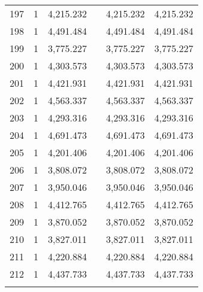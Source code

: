 \begin{table}[!htbp]
\begin{tabular}{@{\extracolsep{5pt}}lccccc}
197 & 1 & 4,215.232 &  & 4,215.232 & 4,215.232 \\ 
198 & 1 & 4,491.484 &  & 4,491.484 & 4,491.484 \\ 
199 & 1 & 3,775.227 &  & 3,775.227 & 3,775.227 \\ 
200 & 1 & 4,303.573 &  & 4,303.573 & 4,303.573 \\ 
201 & 1 & 4,421.931 &  & 4,421.931 & 4,421.931 \\ 
202 & 1 & 4,563.337 &  & 4,563.337 & 4,563.337 \\ 
203 & 1 & 4,293.316 &  & 4,293.316 & 4,293.316 \\ 
204 & 1 & 4,691.473 &  & 4,691.473 & 4,691.473 \\ 
205 & 1 & 4,201.406 &  & 4,201.406 & 4,201.406 \\ 
206 & 1 & 3,808.072 &  & 3,808.072 & 3,808.072 \\ 
207 & 1 & 3,950.046 &  & 3,950.046 & 3,950.046 \\ 
208 & 1 & 4,412.765 &  & 4,412.765 & 4,412.765 \\ 
209 & 1 & 3,870.052 &  & 3,870.052 & 3,870.052 \\ 
210 & 1 & 3,827.011 &  & 3,827.011 & 3,827.011 \\ 
211 & 1 & 4,220.884 &  & 4,220.884 & 4,220.884 \\ 
212 & 1 & 4,437.733 &  & 4,437.733 & 4,437.733 \\ 
\hline \\[-1.8ex] 
\end{tabular} 
\end{table} 
